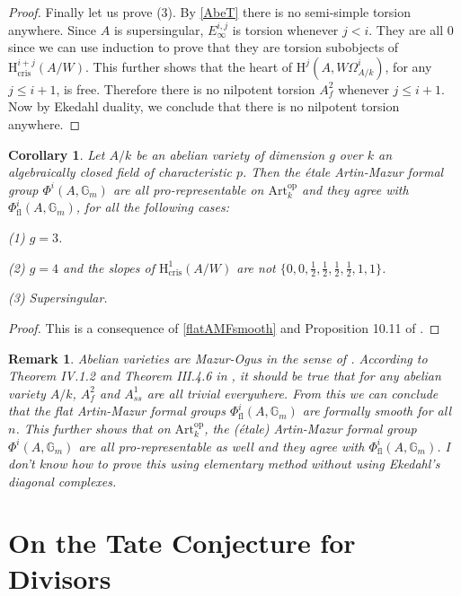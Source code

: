 \documentclass[a4paper,12pt,twoside]{report}
\newtheorem{corollary}[theorem]{Corollary}
\newtheorem{remark}[theorem]{Remark}
\newcommand{\G}{\mathbb{G}}
\newcommand{\cris}{\mathrm{cris}}
\newcommand{\Art}{\mathrm{Art}}
\newcommand{\HH}{\mathrm{H}}
\newcommand{\op}{\mathrm{op}}
\newcommand{\fl}{\mathrm{fl}}
\begin{document}
\begin{proof}
Finally let us prove (3). By \ref{AbeT} there is no semi-simple torsion anywhere. 
Since $A$ is supersingular, $E_\infty^{i,j}$ is torsion whenever $j<i$. 
They are all $0$ since we can use induction to prove that they are torsion subobjects of $\HH^{i+j}_{\cris}(A/W)$. 
This further shows that the heart of $\HH^j(A,W\Omega^i_{A/k})$, for any $j\leqslant i+1$, is free. 
Therefore there is no nilpotent torsion $A_f^2$ whenever $j\leqslant i+1$. 
Now by Ekedahl duality, we conclude that there is no nilpotent torsion anywhere. 
\end{proof} 

\begin{corollary}
    Let $A/k$ be an abelian variety of dimension $g$ 
    over $k$ an algebraically closed field of characteristic $p$. 
    Then the \'etale Artin-Mazur formal group
    $\Phi^i(A,\G_m)$ are all pro-representable  on $\Art^{\op}_k$ and they agree with $\Phi^i_{\fl}(A,\G_m)$, for all the following cases: 
    
    {\rm (1)} $g=3$. 

    {\rm (2)} $g=4$ and the slopes of $\HH^1_{\cris}(A/W)$ are not $\{0,0,\frac{1}{2},\frac{1}{2},\frac{1}{2},\frac{1}{2},1,1\}$. 

    {\rm (3)} Supersingular.  
\end{corollary}

\begin{proof}
     This is a consequence of \ref{flatAMFsmooth} and Proposition 10.11 of \cite{BO}. 
\end{proof}

\begin{remark}{\rm
    Abelian varieties are Mazur-Ogus in the sense of \cite{Ek3}. 
    According to Theorem IV.1.2 and Theorem III.4.6 in \cite{Ek3}, 
    it should be true that for any abelian variety $A/k$, $A_f^2$ and $A_{ss}^1$ are all trivial everywhere. 
    From this we can conclude that the flat Artin-Mazur formal groups $\Phi^i_{\fl}(A,\G_m)$ are formally smooth for all $n$. 
    This further shows that on $\Art^{\op}_k$, the (\'etale) Artin-Mazur formal group 
    $\Phi^i(A,\G_m)$ are all pro-representable as well and they agree with $\Phi^i_{\fl}(A,\G_m)$. 
    I don't know how to prove this using elementary method without using Ekedahl's diagonal complexes.}
\end{remark}

\section{On the Tate Conjecture for Divisors}
\end{document}
